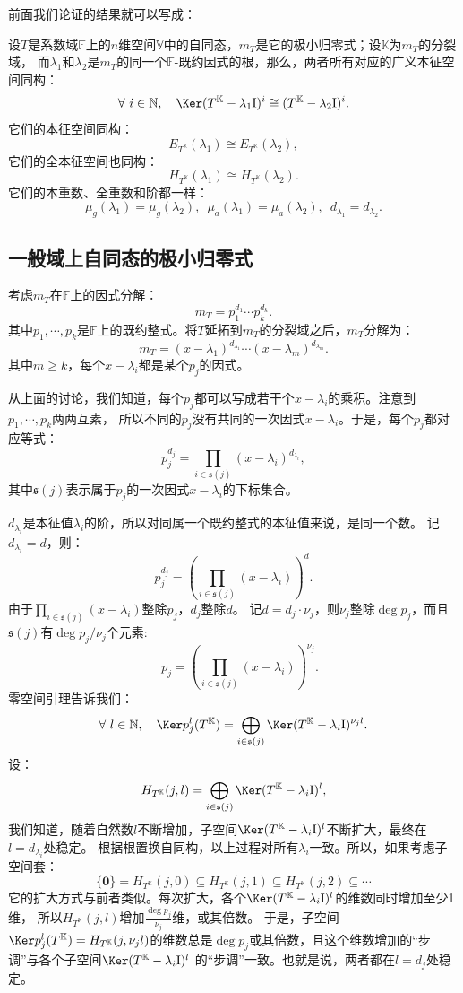 \documentclass[12pt,UTF8,fontset=none]{ctexbook}
\begin{document}
前面我们论证的结果就可以写成：
\begin{pp}\label{pp:9_7_0}
设$T$是系数域$\mathbb{F}$上的$n$维空间$\mathbb{V}$中的自同态，$m_T$是它的极小归零式；设$\mathbb{K}$为$m_T$的分裂域，
而$\lambda_1$和$\lambda_2$是$m_T$的同一个$\mathbb{F}$-既约因式的根，那么，两者所有对应的广义本征空间同构：
$$ \forall \,\, i \in \mathbb{N}, \quad \Ker (T^{\mathbb{K}} - \lambda_1\mathrm{I})^i \cong (T^{\mathbb{K}} - \lambda_2\mathrm{I})^i. $$
它们的本征空间同构：
$$E_{T^{\mathbb{K}}}(\lambda_1) \cong E_{T^{\mathbb{K}}}(\lambda_2),$$
它们的全本征空间也同构：
$$H_{T^{\mathbb{K}}}(\lambda_1) \cong H_{T^{\mathbb{K}}}(\lambda_2).$$
它们的本重数、全重数和阶都一样：
$$ \mu_g(\lambda_1) = \mu_g(\lambda_2), \,\,\, \mu_a(\lambda_1) = \mu_a(\lambda_2), \,\,\, d_{\lambda_1} = d_{\lambda_2}.$$
\end{pp}

\subsection{一般域上自同态的极小归零式}
考虑$m_T$在$\mathbb{F}$上的因式分解：
$$ m_T = p_1^{d_1}\cdots p_k^{d_k}.$$
其中$p_1, \cdots , p_k$是$\mathbb{F}$上的既约整式。将$T$延拓到$m_T$的分裂域之后，$m_T$分解为：
$$ m_T = (x - \lambda_1)^{d_{\lambda_1}}\cdots (x - \lambda_m)^{d_{\lambda_m}}.$$
其中$m \geqslant k$，每个$x - \lambda_i$都是某个$p_j$的因式。

从上面的讨论，我们知道，每个$p_j$都可以写成若干个$x - \lambda_i$的乘积。注意到$p_1, \cdots , p_k$两两互素，
所以不同的$p_j$没有共同的一次因式$x - \lambda_i$。于是，每个$p_j$都对应等式：
$$ p_j^{d_j} = \prod_{i\in \mathfrak{s}(j)} (x - \lambda_i)^{d_{\lambda_i}},$$
其中$\mathfrak{s}(j)$表示属于$p_j$的一次因式$x - \lambda_i$的下标集合。

$d_{\lambda_i}$是本征值$\lambda_i$的阶，所以对同属一个既约整式的本征值来说，是同一个数。
记$d_{\lambda_i} = d$，则：
$$ p_j^{d_j} = \left(\prod_{i\in \mathfrak{s}(j)} (x - \lambda_i)\right)^d. $$
由于$\prod_{i\in \mathfrak{s}(j)} (x - \lambda_i)$整除$p_j$，$d_j$整除$d$。
记$d = d_j \cdot \nu_j$，则$\nu_j$整除$\deg p_j$，而且$\mathfrak{s}(j)$有$\deg p_j / \nu_j$个元素:
$$\quad p_j = \left(\prod_{i\in \mathfrak{s}(j)} (x - \lambda_i)\right)^{\nu_j}. $$
零空间引理告诉我们：
$$ \forall \,\,l \in\mathbb{N},\quad  \Ker p_j^{l}(T^{\mathbb{K}}) = \bigoplus_{i\in \mathfrak{s}(j)} \Ker (T^{\mathbb{K}} - \lambda_i\mathrm{I})^{\nu_j l}.$$
设：
$$ H_{T^{\mathbb{K}}}(j,l) = \bigoplus_{i\in \mathfrak{s}(j)} \Ker (T^{\mathbb{K}} - \lambda_i\mathrm{I})^{l},$$
我们知道，随着自然数$l$不断增加，子空间$\Ker (T^{\mathbb{K}} - \lambda_i\mathrm{I})^{l}$不断扩大，最终在$l = d_{\lambda_i}$处稳定。
根据根置换自同构，以上过程对所有$\lambda_i$一致。所以，如果考虑子空间套：
$$ \{\mathbf{0}\} = H_{T^{\mathbb{K}}}(j,0) \subseteq H_{T^{\mathbb{K}}}(j,1) \subseteq H_{T^{\mathbb{K}}}(j,2) \subseteq \cdots $$
它的扩大方式与前者类似。每次扩大，各个$\Ker (T^{\mathbb{K}} - \lambda_i\mathrm{I})^{l}$的维数同时增加至少1维，
所以$H_{T^{\mathbb{K}}}(j,l)$增加$\frac{\deg p_j}{\nu_j}$维，或其倍数。
于是，子空间$\Ker p_j^{l}(T^{\mathbb{K}}) = H_{T^{\mathbb{K}}}(j,\nu_j l)$的维数总是$\deg p_j$或其倍数，且这个维数增加的“步调”与各个子空间$\Ker (T^{\mathbb{K}} - \lambda_i\mathrm{I})^{l}$
的“步调”一致。也就是说，两者都在$l = d_j$处稳定。
\end{document}
